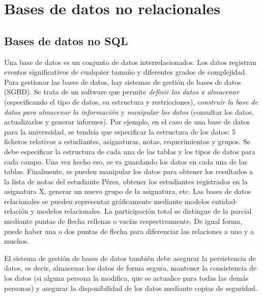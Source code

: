 \chapter{Bases de datos no relacionales}
\section{Bases de datos no SQL}
Una base de datos es un conjunto de datos interrelacionados. Los datos registran eventos significativos de cualquier tamaño y diferentes grados de complejidad. Para gestionar las bases de datos, hay sistemas de gestión de bases de datos (SGBD). Se trata de un software que permite \textit{definir los datos a almacenar} (especificando el tipo de datos, su estructura y restricciones), \textit{construir la base de datos para almacenar la información} y \textit{manipular los datos} (consultar los datos, actualizarlos y generar informes). Por ejemplo, en el caso de una base de datos para la universidad, se tendría que especificar la estructura de los datos: 5 ficheros relativos a estudiantes, asignaturas, notas, requerimientos y grupos. Se debe especificar la estructura de cada una de las tablas y los tipos de datos para cada campo. Una vez hecho eso, se va guardando los datos en cada una de las tablas. Finalmente, se pueden manipular los datos para obtener los resultados a la lista de notas del estudiante Pérez, obtener los estudiantes registrados en la asignatura X, generar un nuevo grupo de la asignatura, etc. Las bases de datos relacionales se pueden representar gráficamente mediante modelos entidad-relación y modelos relacionales. La participación total se distingue de la parcial mediante puntas de flecha rellenas o vacías respectivamente. De igual forma, puede haber una o dos puntas de flecha para diferenciar las relaciones a uno y a muchos.

El sistema de gestión de bases de datos también debe asegurar la persistencia de datos, es decir, almacenar los datos de forma segura, mantener la consistencia de los datos (si alguna persona la modifica, que se actualice para todas las demás personas) y asegurar la disponibilidad de los datos mediante copias de seguridad.

